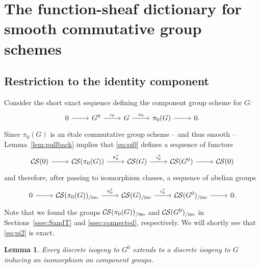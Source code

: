 \documentclass[10pt]{amsart}
\theoremstyle{plain}
\newtheorem{lemma}[theorem]{Lemma}
\theoremstyle{definition}
\newcommand{\CS}{{\mathcal{C\hskip-0.8pt S}}}
\newcommand{\CSiso}[1]{\CS(#1)_{/\text{iso}}}
\begin{document}
\section{The function-sheaf dictionary for smooth commutative group schemes}\label{sec:main}


\subsection{Restriction to the identity component} \label{ssec:restriction}

Consider the short exact sequence
defining the component group scheme for $G$:
\begin{equation}\label{eq:pi0}
\begin{tikzcd}
0 \rar & G^0 \arrow{r}{\iota_0} & G \arrow{r}{\pi_0} & \pi_0(G) \rar & 0.
\end{tikzcd}
\end{equation}
Since $\pi_0(G)$ is an \'etale commutative group scheme -- and thus smooth --
Lemma~\ref{lem:pullback} implies that \eqref{eq:pi0} defines a sequence of functors
\begin{equation}\label{eq:pi1}
\begin{tikzcd}
\CS(0) \rar & \CS(\pi_0(G)) \arrow{r}{\pi_0^*} & \CS(G) \arrow{r}{\iota_0^*} & \CS(G^0) \rar & \CS(0)
\end{tikzcd}
\end{equation}
and therefore, after passing to isomorphism classes, a sequence of abelian groups
\begin{equation}\label{eq:pi2}
\begin{tikzcd}
0 \rar &
\CSiso{\pi_0(G)} \arrow{r}{\pi_0^*} & \CSiso{G} \arrow{r}{\iota_0^*} & \CSiso{G^0} \rar & 0.
\end{tikzcd}
\end{equation}
 Note that we found the groups $\CSiso{\pi_0(G)}$ and $\CSiso{G^0}$
in Sections~\ref{ssec:SandT} and \ref{ssec:connected}, respectively.
We will shortly see that \eqref{eq:pi2} is exact.


\begin{lemma}\label{lemma:ext}
Every discrete isogeny to $G^0$ extends to a discrete
isogeny to $G$ inducing an isomorphism on component groups.
\end{lemma}
\end{document}
